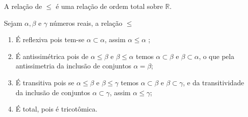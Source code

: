 \documentclass[../main.tex]{subfiles}
\begin{document}
\begin{teo}
    A relação de $\leq$ é uma relação de ordem total sobre $\mathbb{R}$.
\end{teo}
\begin{dem}
    Sejam $\alpha, \beta$ e $\gamma$ números reais, a relação $\leq$
    \begin{enumerate}[label=(\roman*)]
        \item É reflexiva pois tem-se $\alpha \subset \alpha$, assim $\alpha \leq \alpha$ ;
        \item É antissimétrica pois de $\alpha \leq \beta$ e $\beta \leq \alpha$ temos $\alpha \subset \beta$ e $\beta \subset \alpha$, o que pela antissimetria da inclusão de conjuntos $\alpha = \beta$;
        \item É transitiva pois se $\alpha \leq \beta$ e $\beta \leq \gamma$ temos $\alpha \subset \beta$ e $\beta \subset \gamma$, e da transitividade da inclusão de conjuntos $\alpha \subset \gamma$, assim $\alpha \leq \gamma$;
        \item É total, pois é tricotômica.
    \end{enumerate}
\end{dem}
\end{document}

